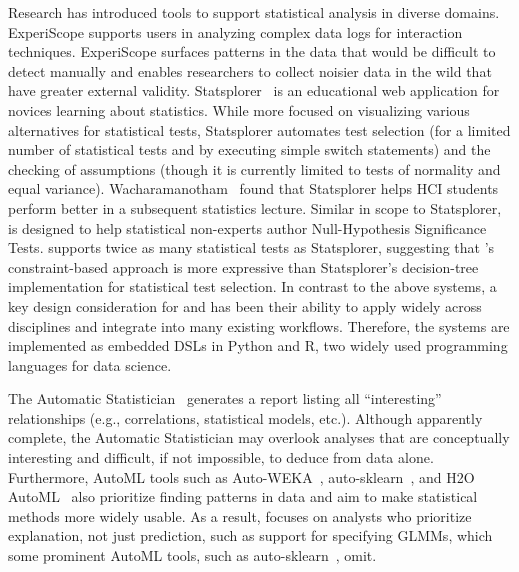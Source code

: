 Research has introduced tools to support statistical analysis in diverse
domains. ExperiScope \cite{guimbretiere2007experiscope} supports users in
analyzing complex data logs for interaction techniques. ExperiScope surfaces
patterns in the data that would be difficult to detect manually and enables
researchers to collect noisier data in the wild that have greater external
validity. Statsplorer~\cite{wacharamanotham2015statsplorer} is an educational
web application for novices learning about statistics. While more focused on
visualizing various alternatives for statistical tests, Statsplorer automates
test selection (for a limited number of statistical tests and by executing
simple switch statements) and the checking of assumptions (though it is
currently limited to tests of normality and equal variance).
Wacharamanotham~\cite{wacharamanotham2015statsplorer} found that Statsplorer
helps HCI students perform better in a subsequent statistics lecture. Similar in
scope to Statsplorer, \tea is designed to help statistical non-experts author
Null-Hypothesis Significance Tests. \tea supports twice as many statistical
tests as Statsplorer, suggesting that \tea's constraint-based approach is more
expressive than Statsplorer's decision-tree implementation for statistical test
selection. In contrast to the above systems, a key design consideration for \tea
and \tisane has been their ability to apply widely across disciplines and
integrate into many existing workflows. Therefore, the systems are implemented
as embedded DSLs in Python and R, two widely used programming languages for data
science.

The Automatic Statistician~\cite{lloyd2014automatic} generates a report listing
all ``interesting'' relationships (e.g., correlations, statistical models,
etc.). %
Although apparently complete, the Automatic Statistician may overlook analyses
that are conceptually interesting and difficult, if not impossible, to deduce
from data alone. Furthermore, AutoML tools such as Auto-WEKA~\cite{autoweka},
auto-sklearn~\cite{autosklearn}, and H2O AutoML~\cite{H2OAutoML20} also
prioritize finding patterns in data and aim to make statistical methods more
widely usable.  As a result, \tisane focuses
on analysts who prioritize explanation, not just prediction, such as support for
specifying GLMMs, which some prominent AutoML tools, such as
auto-sklearn~\cite{autosklearn}, omit. 

